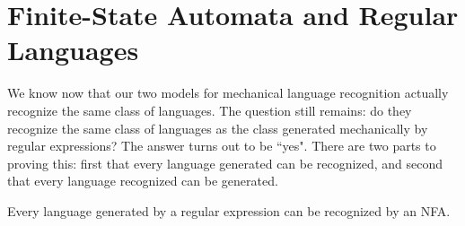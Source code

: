 \section{Finite-State Automata and Regular Languages}\label{S-fsa-3}

We know now that our two models for mechanical language recognition actually
recognize the same class of languages.  The question still remains: do they
recognize the same class of languages as the class generated mechanically by regular
expressions?  The answer turns out to be ``yes".  There are two parts to proving
this: first that every language generated can be recognized, and second that
every language recognized can be generated.

\begin{theorem}\label{retonfa}
Every language generated by a regular expression can be recognized by an NFA.
\end{theorem}

